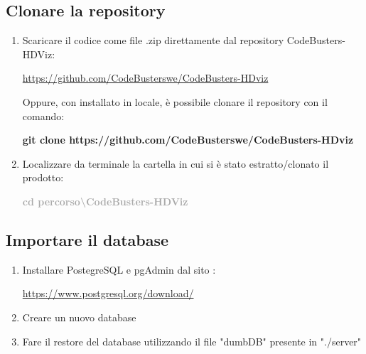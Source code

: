 \subsection{Clonare la repository}
\begin{enumerate}
	\item Scaricare il codice come file .zip direttamente dal repository CodeBusters-HDViz:
		\begin{center}
			\textcolor{blue}{\url{https://github.com/CodeBusterswe/CodeBusters-HDviz}}
		\end{center}	
	Oppure, con  installato in locale, è possibile clonare il repository con il comando:
		\begin{center}
			\textcolor{coloreRosso}{\textbf{git clone https://github.com/CodeBusterswe/CodeBusters-HDviz}}
		\end{center}
      
	\item Localizzare da terminale la cartella in cui si è stato estratto/clonato il prodotto:  
		\begin{center}
			\textcolor{darkgray}{\textbf{cd percorso\textbackslash CodeBusters-HDViz}}
 		\end{center}
\end{enumerate}
\subsection{Importare il database}
\begin{enumerate}
\item Installare PostegreSQL e pgAdmin dal sito :
	\begin{center}
			\textcolor{blue}{\url{https://www.postgresql.org/download/}}
	\end{center}	
\item Creare un nuovo database
\item Fare il restore del database utilizzando il file "dumbDB" presente in "./server"
\end{enumerate}
